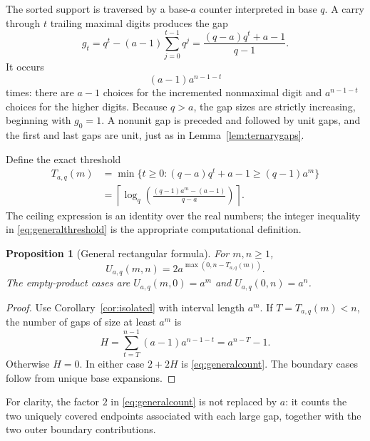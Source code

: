 \documentclass[11pt,letterpaper]{article}
\numberwithin{equation}{section}
\newtheorem{proposition}[theorem]{Proposition}
\theoremstyle{definition}
\theoremstyle{remark}
\newcommand{\ceil}[1]{\left\lceil#1\right\rceil}
\begin{document}
The sorted support is traversed by a base-$a$ counter interpreted in base
$q$. A carry through $t$ trailing maximal digits produces the gap
\begin{equation}\label{eq:generalgap}
 g_t=q^t-(a-1)\sum_{j=0}^{t-1}q^j
     =\frac{(q-a)q^t+a-1}{q-1}.
\end{equation}
It occurs
\begin{equation}\label{eq:generalmultiplicity}
 (a-1)a^{n-1-t}
\end{equation}
times: there are $a-1$ choices for the incremented nonmaximal digit and
$a^{n-1-t}$ choices for the higher digits. Because $q>a$, the gap sizes
are strictly increasing, beginning with $g_0=1$. A nonunit gap is
preceded and followed by unit gaps, and the first and last gaps are
unit, just as in Lemma~\ref{lem:ternarygaps}.

Define the exact threshold
\begin{align}
 T_{a,q}(m)
 &=\min\{t\ge0:(q-a)q^t+a-1\ge(q-1)a^m\}\label{eq:generalthreshold}\\
 &=\ceil{\log_q\!\left(\frac{(q-1)a^m-(a-1)}{q-a}\right)}.
 \label{eq:generallogthreshold}
\end{align}
The ceiling expression is an identity over the real numbers; the integer
inequality in \eqref{eq:generalthreshold} is the appropriate computational
definition.

\begin{proposition}[General rectangular formula]\label{prop:generalcount}
For $m,n\ge1$,
\begin{equation}\label{eq:generalcount}
 U_{a,q}(m,n)=2a^{\max(0,n-T_{a,q}(m))}.
\end{equation}
The empty-product cases are
$U_{a,q}(m,0)=a^m$ and $U_{a,q}(0,n)=a^n$.
\end{proposition}
\begin{proof}
Use Corollary~\ref{cor:isolated} with interval length $a^m$.
If $T=T_{a,q}(m)<n$, the number of gaps of size at least $a^m$ is
\[
 H=\sum_{t=T}^{n-1}(a-1)a^{n-1-t}=a^{n-T}-1.
\]
Otherwise $H=0$. In either case $2+2H$ is \eqref{eq:generalcount}.
The boundary cases follow from unique base expansions.
\end{proof}

For clarity, the factor $2$ in \eqref{eq:generalcount} is not replaced by
$a$: it counts the two uniquely covered endpoints associated with each
large gap, together with the two outer boundary contributions.
\end{document}

